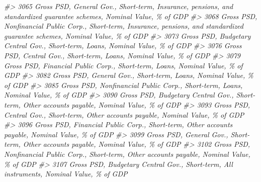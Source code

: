 \documentclass[
]{bxjsbook}
\newenvironment{Shaded}{\begin{snugshade}}{\end{snugshade}}
\newcommand{\CommentTok}[1]{\textcolor[rgb]{0.56,0.35,0.01}{\textit{#1}}}
\theoremstyle{definition}
\theoremstyle{definition}
\theoremstyle{definition}
\theoremstyle{definition}
\theoremstyle{remark}
\begin{document}
\begin{Shaded}
\begin{Highlighting}[]
\CommentTok{\#\textgreater{} 3065                                                      Gross PSD, General Gov., Short{-}term, Insurance, pensions, and standardized guarantee schemes, Nominal Value, \% of GDP}
\CommentTok{\#\textgreater{} 3068                                         Gross PSD, Nonfinancial Public Corp., Short{-}term, Insurance, pensions, and standardized guarantee schemes, Nominal Value, \% of GDP}
\CommentTok{\#\textgreater{} 3073                                                                                              Gross PSD, Budgetary Central Gov., Short{-}term, Loans, Nominal Value, \% of GDP}
\CommentTok{\#\textgreater{} 3076                                                                                                        Gross PSD, Central Gov., Short{-}term, Loans, Nominal Value, \% of GDP}
\CommentTok{\#\textgreater{} 3079                                                                                              Gross PSD, Financial Public Corp., Short{-}term, Loans, Nominal Value, \% of GDP}
\CommentTok{\#\textgreater{} 3082                                                                                                        Gross PSD, General Gov., Short{-}term, Loans, Nominal Value, \% of GDP}
\CommentTok{\#\textgreater{} 3085                                                                                           Gross PSD, Nonfinancial Public Corp., Short{-}term, Loans, Nominal Value, \% of GDP}
\CommentTok{\#\textgreater{} 3090                                                                             Gross PSD, Budgetary Central Gov., Short{-}term, Other accounts payable, Nominal Value, \% of GDP}
\CommentTok{\#\textgreater{} 3093                                                                                       Gross PSD, Central Gov., Short{-}term, Other accounts payable, Nominal Value, \% of GDP}
\CommentTok{\#\textgreater{} 3096                                                                             Gross PSD, Financial Public Corp., Short{-}term, Other accounts payable, Nominal Value, \% of GDP}
\CommentTok{\#\textgreater{} 3099                                                                                       Gross PSD, General Gov., Short{-}term, Other accounts payable, Nominal Value, \% of GDP}
\CommentTok{\#\textgreater{} 3102                                                                          Gross PSD, Nonfinancial Public Corp., Short{-}term, Other accounts payable, Nominal Value, \% of GDP}
\CommentTok{\#\textgreater{} 3107                                                                                    Gross PSD, Budgetary Central Gov., Short{-}term, All instruments, Nominal Value, \% of GDP}

\end{Highlighting}
\end{Shaded}
\end{document}
